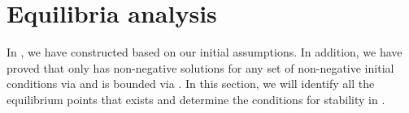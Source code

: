 \section{Equilibria analysis}\label{sec:equilibria-analysis}
In , we have constructed  based on our initial assumptions.
In addition, we have proved that  only has non-negative solutions for any set of non-negative initial conditions via  and is bounded via .
In this section, we will identify all the equilibrium points that exists and determine the conditions for stability in .

